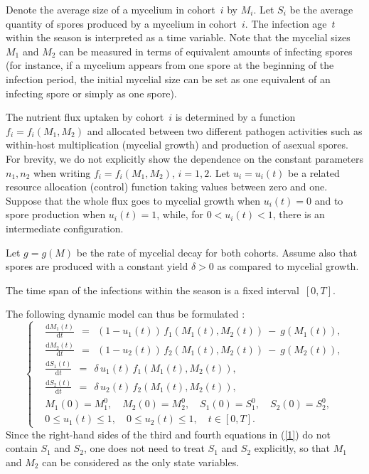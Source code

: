 \documentclass[a4paper,12pt]{article}
\begin{document}
Denote the average size of a mycelium in cohort~$ i $ by $ M_i $. Let $ S_i $ be the average quantity of spores produced by a mycelium
in cohort~$ i $. The infection age~$ t $ within the season is interpreted as a time variable. Note that the mycelial sizes~$ M_1 $ and
$ M_2 $ can be measured in terms of equivalent amounts of infecting spores (for instance, if a mycelium appears from one spore at
the beginning of the infection period, the initial mycelial size can be set as one equivalent of an infecting spore or simply as one
spore).

The nutrient flux uptaken by cohort~$ i $ is determined by a function $ f_i = f_i(M_1, M_2) $ and allocated between two
different pathogen activities such as within-host multiplication (mycelial growth) and production of asexual spores.
For brevity, we do not explicitly show the dependence on the constant parameters $ n_1, n_2 $ when writing $ f_i = f_i(M_1, M_2) $,
$ i = 1,2 $. Let $ u_i = u_i(t) $ be a related resource allocation (control) function taking values between zero and one. Suppose that
the whole flux goes to mycelial growth when $ u_i(t) = 0 $ and to spore production when $ u_i(t) = 1 $, while, for $ 0 < u_i(t) < 1 $,
there is an intermediate configuration.

Let $ g = g(M) $ be the rate of mycelial decay for both cohorts. Assume also that spores are produced with a constant yield
$ \delta > 0 $ as compared to mycelial growth.

The time span of the infections within the season is a fixed interval~$ [0, T] $.

The following dynamic model can thus be formulated \cite{YegorovGrognardMailleretHalkettBernhard2019}:
\begin{equation}
\left\{ \begin{aligned}
& \frac{\mathrm{d} M_1(t)}{\mathrm{d} t} \:\: = \:\: (1 - u_1(t)) \, f_1(M_1(t), M_2(t)) \: - \: g(M_1(t)), \\
& \frac{\mathrm{d} M_2(t)}{\mathrm{d} t} \:\: = \:\: (1 - u_2(t)) \, f_2(M_1(t), M_2(t)) \: - \: g(M_2(t)), \\
& \frac{\mathrm{d} S_1(t)}{\mathrm{d} t} \:\: = \:\: \delta \, u_1(t) \, f_1(M_1(t), M_2(t)), \\
& \frac{\mathrm{d} S_2(t)}{\mathrm{d} t} \:\: = \:\: \delta \, u_2(t) \, f_2(M_1(t), M_2(t)), \\
& M_1(0) = M_1^0, \quad M_2(0) = M_2^0, \quad S_1(0) = S_1^0, \quad S_2(0) = S_2^0, \\
& 0 \leqslant u_1(t) \leqslant 1, \quad 0 \leqslant u_2(t) \leqslant 1, \quad t \in [0, T].
\end{aligned} \right.  \label{1}
\end{equation}
Since the right-hand sides of the third and fourth equations in (\ref{1}) do not contain $ S_1 $ and $ S_2 $, one does not need
to treat $ S_1 $ and $ S_2 $ explicitly, so that $ M_1 $ and $ M_2 $ can be considered as the only state variables.
\end{document}

